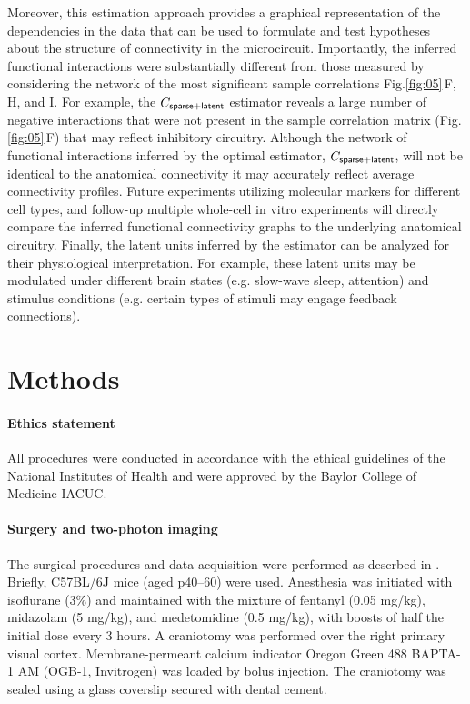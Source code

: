 \documentclass[10pt]{article}
\newcommand{\figref}[2]{Fig.\;\ref{fig:#1}\,#2}
\begin{document}
Moreover, this estimation approach provides a graphical representation of the dependencies in the data that can be used to formulate and test hypotheses about the structure of connectivity in the microcircuit. Importantly, the inferred functional interactions were substantially different from those measured by considering the network of the most significant sample correlations \figref{05}{F, H, and I}.  For example, the $C_{\sf sparse+latent}$ estimator reveals a large number of negative interactions that were not present in the sample correlation matrix (\figref{05}{F}) that may reflect inhibitory circuitry.  Although the network of functional interactions inferred by the optimal estimator, $C_{\sf sparse+latent}$, will not be identical to the anatomical connectivity it may accurately reflect average connectivity profiles. Future experiments utilizing molecular markers for different cell types, and follow-up multiple whole-cell in vitro experiments \cite{Hofer:2011, Ko:2013} will directly compare the inferred functional connectivity graphs to the underlying anatomical circuitry. Finally, the latent units inferred by the estimator can be analyzed for their physiological interpretation. For example, these latent units may be modulated under different brain states (e.g. slow-wave sleep, attention) and stimulus conditions (e.g. certain types of stimuli may engage feedback connections). 

\section*{Methods}
\paragraph{Ethics statement}
All procedures were conducted in accordance with the ethical guidelines of the National Institutes of Health and were approved by the Baylor College of Medicine IACUC. 

\paragraph{Surgery and two-photon imaging}
The surgical procedures and data acquisition were performed as descrbed in \cite{Cotton:2013}. Briefly, C57BL/6J mice (aged p40--60) were used. Anesthesia was initiated with isoflurane (3\%) and maintained with the mixture of fentanyl (0.05 mg/kg), midazolam (5 mg/kg), and medetomidine (0.5 mg/kg), with boosts of half the initial dose every 3 hours.  A craniotomy was performed over the right primary visual cortex.  Membrane-permeant calcium indicator Oregon Green 488 BAPTA-1 AM (OGB-1, Invitrogen) was loaded by bolus injection.  The craniotomy was sealed using a glass coverslip secured with dental cement. 
\end{document}
